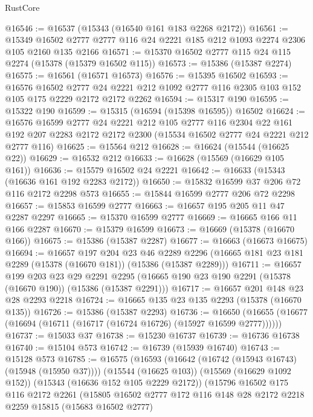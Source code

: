 \begin{lexlean}{RustCore}
\begin{coremodule}
@16546 := @16537 (@15343 (@16540 @161 @183 @2268 @2172))
@16561 := @15349 @16502 @2777 @2777 @116 @24 @2221 @185 @212 @1093 @2274 @2306 @105 @2160 @135 @2166
@16571 := @15370 @16502 @2777 @115 @24 @115 @2274 (@15378 (@15379 @16502 @115))
@16573 := @15386 (@15387 @2274)
@16575 := @16561 (@16571 @16573)
@16576 := @15395 @16502
@16593 := @16576
    @16502
    @2777
    @24
    @2221
    @212
    @1092
    @2777
    @116
    @2305
    @103
    @152
    @105
    @175
    @2229
    @2172
    @2172
    @2262
@16594 := @15317 @190
@16595 := @15322 @190
@16599 := @15315 (@16594 (@15398 @16595)) @16502
@16624 := @16576
    @16599
    @2777
    @24
    @2221
    @212
    @105
    @2777
    @116
    @2304
    @22
    @161
    @192
    @207
    @2283
    @2172
    @2172
    @2300
    (@15534 @16502 @2777 @24 @2221 @212 @2777 @116)
@16625 := @15564 @212
@16628 := @16624 (@15544 (@16625 @22))
@16629 := @16532 @212
@16633 := @16628 (@15569 (@16629 @105 @161))
@16636 := @15579 @16502 @24 @2221
@16642 := @16633 (@15343 (@16636 @161 @192 @2283 @2172))
@16650 := @15832 @16599 @37 @206 @72 @116 @2172 @2298 @573
@16655 := @15844 @16599 @2777 @206 @72 @2298
@16657 := @15853 @16599 @2777
@16663 := @16657 @195 @205 @11 @47 @2287 @2297
@16665 := @15370 @16599 @2777
@16669 := @16665 @166 @11 @166 @2287
@16670 := @15379 @16599
@16673 := @16669 (@15378 (@16670 @166))
@16675 := @15386 (@15387 @2287)
@16677 := @16663 (@16673 @16675)
@16694 := @16657
    @197
    @204
    @23
    @46
    @2289
    @2296
    (@16665 @181 @23 @181 @2289 (@15378 (@16670 @181)) (@15386 (@15387 @2289)))
@16711 := @16657
    @199
    @203
    @23
    @29
    @2291
    @2295
    (@16665 @190 @23 @190 @2291 (@15378 (@16670 @190)) (@15386 (@15387 @2291)))
@16717 := @16657 @201 @148 @23 @28 @2293 @2218
@16724 := @16665 @135 @23 @135 @2293 (@15378 (@16670 @135))
@16726 := @15386 (@15387 @2293)
@16736 := @16650 (@16655 (@16677 (@16694 (@16711 (@16717 (@16724 @16726) (@15927 @16599 @2777))))))
@16737 := @15033 @37
@16738 := @15230 @16737
@16739 := @16736 @16738
@16740 := @15104 @573
@16742 := @16739 (@15939 @16740)
@16743 := @15128 @573
@16785 := @16575
    (@16593
      (@16642 (@16742 (@15943 @16743) (@15948 (@15950 @37))))
      (@15544 (@16625 @103))
      (@15569 (@16629 @1092 @152))
      (@15343 (@16636 @152 @105 @2229 @2172))
      (@15796
        @16502
        @175
        @116
        @2172
        @2261
        (@15805
          @16502
          @2777
          @172
          @116
          @148
          @28
          @2172
          @2218
          @2259
          @15815
          (@15683 @16502 @2777)

\end{coremodule}
\end{lexlean}
